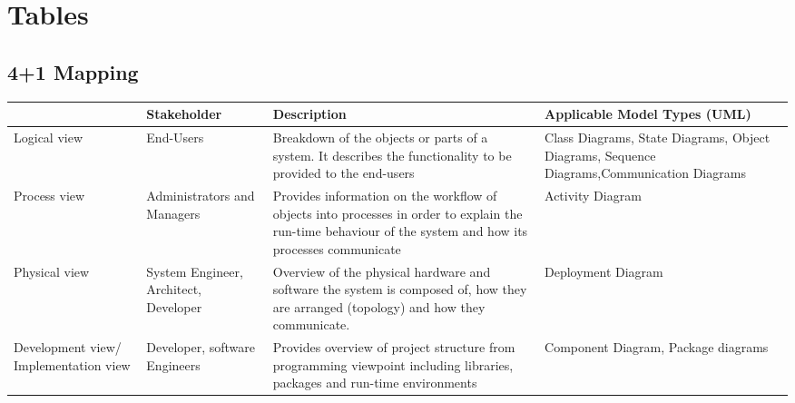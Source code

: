 \chapter{Tables}
\label{appendix:tables}


\section{4+1 Mapping}
\begin{sidewaystable}[h]
\centering
\begin{tabularx}{\textwidth}{X X X X}
\hline
\rowcolor[HTML]{C0C0C0} 
\multicolumn{1}{|X|}{\cellcolor[HTML]{C0C0C0}\textbf{Viewpoint}} & \multicolumn{1}{X|}{\cellcolor[HTML]{C0C0C0}\textbf{Stakeholder}} & \multicolumn{1}{X|}{\cellcolor[HTML]{C0C0C0}\textbf{Description}}                                                                                                              & \multicolumn{1}{X|}{\cellcolor[HTML]{C0C0C0}\textbf{Applicable Model Types (UML)}}                             \\ \hline
\multicolumn{1}{|X|}{Logical view}                               & \multicolumn{1}{X|}{End-Users}                                    & \multicolumn{1}{X|}{Breakdown of the objects or parts of a system. It describes the functionality to be provided to the end-users}                                             & \multicolumn{1}{X|}{Class Diagrams, State Diagrams, Object Diagrams, Sequence Diagrams,Communication Diagrams} \\ \hline
\multicolumn{1}{|X|}{Process view}                               & \multicolumn{1}{X|}{Administrators and Managers}                  & \multicolumn{1}{X|}{Provides information on the workflow of objects into processes in order to explain the run-time behaviour of the system and how its processes communicate} & \multicolumn{1}{X|}{Activity Diagram}                                                                          \\ \hline
\multicolumn{1}{|X|}{Physical view}                              & \multicolumn{1}{X|}{System Engineer, Architect, Developer}        & \multicolumn{1}{X|}{Overview of the physical hardware and software the system is composed of, how they are arranged (topology) and how they communicate.}                      & \multicolumn{1}{X|}{Deployment Diagram}                                                                        \\ \hline
\multicolumn{1}{|X|}{Development view/ Implementation view}      & \multicolumn{1}{X|}{Developer, software Engineers}                & \multicolumn{1}{X|}{Provides overview of project structure from programming viewpoint including libraries, packages and run-time environments}                                 & \multicolumn{1}{X|}{Component Diagram, Package diagrams}                                                       \\ \hline

\end{tabularx}
\end{sidewaystable}

